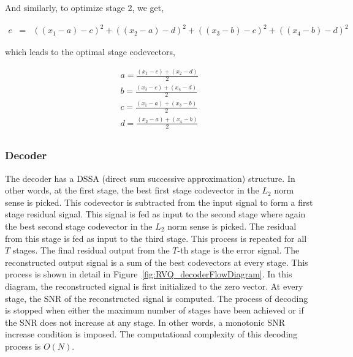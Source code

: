 And similarly, to optimize stage 2, we get,

\begin{equation}
\begin{array}{lllll}
e &=& {((x_1 - a) - c)}^2 + {((x_2- a) - d)}^2 + {((x_3 - b) - c)}^2 + {((x_4 - b) - d)}^2
\end{array}
\label{Eqn:2x2RVQ_stage2}
\end{equation}

which leads to the optimal stage codevectors,

\begin{equation}
\begin{array}{lllll}
a = \frac{(x_1 - c) + (x_2 - d)}{2}\\
b = \frac{(x_3 - c) + (x_4 - d)}{2}\\
c = \frac{(x_1 - a) + (x_3 - b)}{2}\\
d = \frac{(x_2 - a) + (x_4 - b)}{2}\\
\end{array}
\end{equation}


\subsubsection{Decoder}
The decoder has a DSSA (direct sum successive approximation) structure.  In other words, at the first stage, the best first stage codevector in the $L_2$ norm sense is picked.  This codevector is subtracted from the input signal to form a first stage residual signal.  This signal is fed as input to the second stage where again the best second stage codevector in the $L_2$ norm sense is picked.  The residual from this stage is fed as input to the third stage.  This process is repeated for all $T$ stages.  The final residual output from the $T$-th stage is the error signal.  The reconstructed output signal is a sum of the best codevectors at every stage.  This process is shown in detail in Figure~\ref{fig:RVQ_decoderFlowDiagram}.  In this diagram, the reconstructed signal is first initialized to the zero vector.  At every stage, the SNR of the reconstructed signal is computed.  The process of decoding is stopped when either the maximum number of stages have been achieved or if the SNR does not increase at any stage.  In other words, a monotonic SNR increase condition is imposed.  The computational complexity of this decoding process is $O(N)$.  


